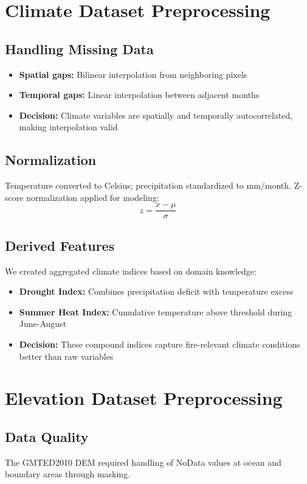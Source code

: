 \section{Climate Dataset Preprocessing}

\subsection*{Handling Missing Data}
\begin{itemize}
    \item \textbf{Spatial gaps:} Bilinear interpolation from neighboring pixels
    \item \textbf{Temporal gaps:} Linear interpolation between adjacent months
    \item \textbf{Decision:} Climate variables are spatially and temporally autocorrelated, making interpolation valid
\end{itemize}

\subsection*{Normalization}
Temperature converted to Celsius; precipitation standardized to mm/month. Z-score normalization applied for modeling:
\begin{equation}
    z = \frac{x - \mu}{\sigma}
\end{equation}

\subsection*{Derived Features}
We created aggregated climate indices based on domain knowledge:
\begin{itemize}
    \item \textbf{Drought Index:} Combines precipitation deficit with temperature excess
    \item \textbf{Summer Heat Index:} Cumulative temperature above threshold during June-August
    \item \textbf{Decision:} These compound indices capture fire-relevant climate conditions better than raw variables
\end{itemize}

\section{Elevation Dataset Preprocessing}

\subsection*{Data Quality}
The GMTED2010 DEM required handling of NoData values at ocean and boundary areas through masking.

